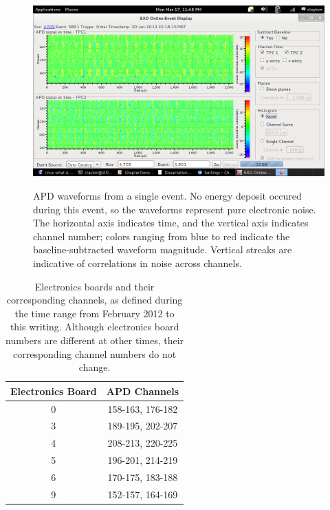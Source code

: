 \begin{figure}
\begin{center}
\includegraphics[keepaspectratio=true,width=\textwidth,clip=true,trim=1mm 21mm 91mm 24mm]{Run4705Ev5801_noiseEventDisplay.png}
\end{center}
\renewcommand{\baselinestretch}{1}
\small\normalsize
\begin{quote}
\caption{APD waveforms from a single event.  No energy deposit occured during this event, so the waveforms represent pure electronic noise.  The horizontal axis indicates time, and the vertical axis indicates channel number; colors ranging from blue to red indicate the baseline-subtracted waveform magnitude.  Vertical streaks are indicative of correlations in noise across channels.}
\label{fig:EvtDisplay_APDNoise}
\end{quote}
\end{figure}
\renewcommand{\baselinestretch}{2}
\small\normalsize

\begin{table}
\begin{center}
\begin{tabular}{|c|c|}
\hline Electronics Board & APD Channels \\ \hline
0 & 158-163, 176-182 \\
3 & 189-195, 202-207 \\
4 & 208-213, 220-225 \\
5 & 196-201, 214-219 \\
6 & 170-175, 183-188 \\
9 & 152-157, 164-169 \\ \hline
\end{tabular}
\end{center}
\caption{Electronics boards and their corresponding channels, as defined during the time range from February 2012 to this writing.  Although electronics board numbers are different at other times, their corresponding channel numbers do not change.}
\label{tab:EBoardChannelNumbers}
\end{table}

